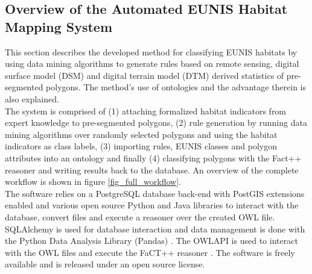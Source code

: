 \documentclass[authoryear, review,12pt,number]{elsarticle}
\begin{document}
\subsection{Overview of the Automated EUNIS Habitat Mapping System}
This section describes the developed method for classifying EUNIS habitats by
using data mining algorithms to generate rules based on remote sensing, digital
surface model (DSM) and digital terrain model (DTM) derived statistics of
pre-segmented polygons. The method's use of ontologies and the advantage
therein is also explained.\\
The system is comprised of (1) attaching
formalized habitat indicators from expert knowledge to pre-segmented polygons,
(2) rule generation by running data mining algorithms over randomly selected
polygons and using the habitat indicators as class labels, (3) importing rules,
EUNIS classes and polygon attributes into an ontology and finally (4)
classifying polygons with the Fact++ reasoner \citep{Tsarkov2006} and writing results back
to the database. An overview of the complete workflow is shown in figure
\ref{fig_full_workflow}.\\
The software relies on a PostgreSQL database back-end with PostGIS extensions
enabled and various open source Python and Java libraries to interact with the
database, convert files and execute a reasoner over the created OWL file.
SQLAlchemy is used for database interaction and data management is done with
the Python Data Analysis Library (Pandas) \citep{McKinney2010}. The OWLAPI is
used to interact with the OWL files and execute the FaCT++ reasoner
\citep{Tsarkov2006}. The software is freely available and is released under an
open source license.  
\end{document}
